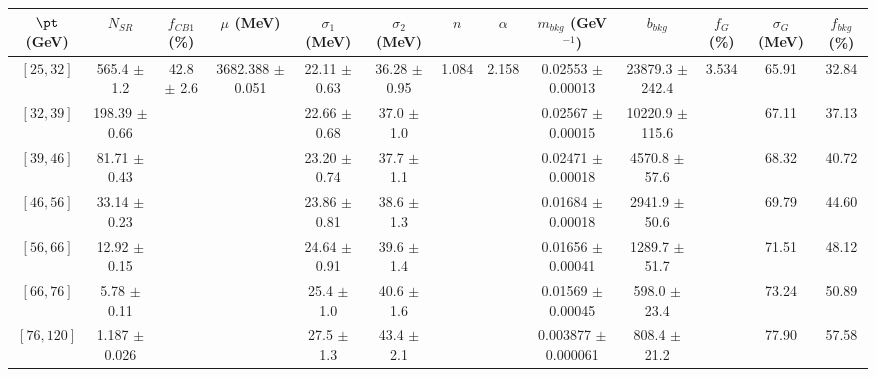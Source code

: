 \begin{tabular}{c||c|c|c|c|c|c|c|c|c|c|c||c}
$\pt$ (GeV) & $N_{SR}$ & $f_{CB1}$ (\%) & $\mu$ (MeV) & $\sigma_1$ (MeV) & $\sigma_2$ (MeV) & $n$ & $\alpha$ & $m_{bkg}$ (GeV$^{-1}$) & $b_{bkg}$ & $f_G$ (\%) & $\sigma_G$ (MeV) & $f_{bkg}$ (\%) \\
\hline
$[25, 32]$ & 565.4 $\pm$ 1.2 & \multirow{7}{*}{42.8 $\pm$ 2.6} & \multirow{7}{*}{3682.388 $\pm$ 0.051} & 22.11 $\pm$ 0.63 & 36.28 $\pm$ 0.95 & \multirow{7}{*}{1.084} & \multirow{7}{*}{2.158} & 0.02553 $\pm$ 0.00013 & 23879.3 $\pm$ 242.4 & \multirow{7}{*}{3.534} & 65.91 & 32.84\\
$[32, 39]$ & 198.39 $\pm$ 0.66 &  &  & 22.66 $\pm$ 0.68 & 37.0 $\pm$ 1.0 &  &  & 0.02567 $\pm$ 0.00015 & 10220.9 $\pm$ 115.6 &  & 67.11 & 37.13\\
$[39, 46]$ & 81.71 $\pm$ 0.43 &  &  & 23.20 $\pm$ 0.74 & 37.7 $\pm$ 1.1 &  &  & 0.02471 $\pm$ 0.00018 & 4570.8 $\pm$ 57.6 &  & 68.32 & 40.72\\
$[46, 56]$ & 33.14 $\pm$ 0.23 &  &  & 23.86 $\pm$ 0.81 & 38.6 $\pm$ 1.3 &  &  & 0.01684 $\pm$ 0.00018 & 2941.9 $\pm$ 50.6 &  & 69.79 & 44.60\\
$[56, 66]$ & 12.92 $\pm$ 0.15 &  &  & 24.64 $\pm$ 0.91 & 39.6 $\pm$ 1.4 &  &  & 0.01656 $\pm$ 0.00041 & 1289.7 $\pm$ 51.7 &  & 71.51 & 48.12\\
$[66, 76]$ & 5.78 $\pm$ 0.11 &  &  & 25.4 $\pm$ 1.0 & 40.6 $\pm$ 1.6 &  &  & 0.01569 $\pm$ 0.00045 & 598.0 $\pm$ 23.4 &  & 73.24 & 50.89\\
$[76, 120]$ & 1.187 $\pm$ 0.026 &  &  & 27.5 $\pm$ 1.3 & 43.4 $\pm$ 2.1 &  &  & 0.003877 $\pm$ 0.000061 & 808.4 $\pm$ 21.2 &  & 77.90 & 57.58\\
\end{tabular}
